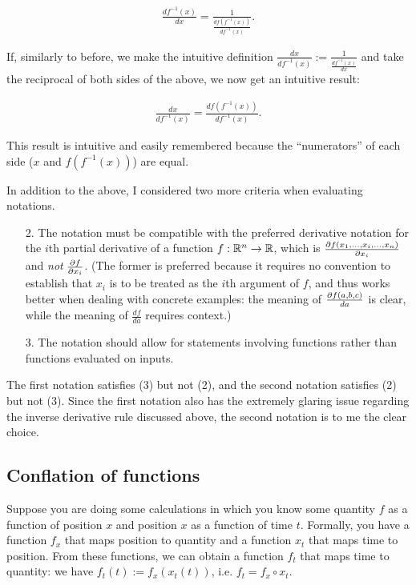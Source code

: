\begin{align*}
    \frac{df^{-1}(x)}{dx} = \frac{1}{\frac{df(f^{-1}(x))}{df^{-1}(x)}}.
\end{align*}

If, similarly to before, we make the intuitive definition $\frac{dx}{df^{-1}(x)} := \frac{1}{\frac{df^{-1}(x)}{dx}}$ and take the reciprocal of both sides of the above, we now get an intuitive result:

\begin{align*}
    \frac{dx}{df^{-1}(x)} = \frac{df(f^{-1}(x))}{df^{-1}(x)}.
\end{align*}

This result is intuitive and easily remembered because the ``numerators'' of each side ($x$ and $f(f^{-1}(x))$) are equal.

In addition to the above, I considered two more criteria when evaluating notations.

\begin{enumerate}
    \item[2.] The notation must be compatible with the preferred derivative notation for the $i$th partial derivative of a function $f:\mathbb{R}^n \rightarrow \mathbb{R}$, which is $\frac{\partial f(x_1, ..., x_i, ..., x_n)}{\partial x_i}$ and \textit{not} $\frac{\partial f}{\partial x_i}$. (The former is preferred because it requires no convention to establish that $x_i$ is to be treated as the $i$th argument of $f$, and thus works better when dealing with concrete examples: the meaning of $\frac{\partial f(a, b, c)}{da}$ is clear, while the meaning of $\frac{df}{da}$ requires context.)
    \item[3.] The notation should allow for statements involving functions rather than functions evaluated on inputs.
\end{enumerate}

The first notation satisfies (3) but not (2), and the second notation satisfies (2) but not (3). Since the first notation also has the extremely glaring issue regarding the inverse derivative rule discussed above, the second notation is to me the clear choice.


\subsection*{Conflation of functions}

Suppose you are doing some calculations in which you know some quantity $f$ as a function of position $x$ and position $x$ as a function of time $t$. Formally, you have a function $f_x$ that maps position to quantity and a function $x_t$ that maps time to position. From these functions, we can obtain a function $f_t$ that maps time to quantity: we have $f_t(t) := f_x(x_t(t))$, i.e. $f_t = f_x \circ x_t$.

